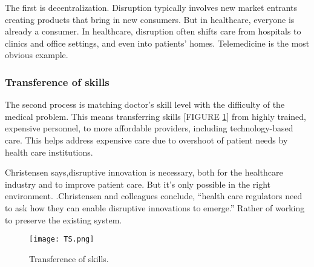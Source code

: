 \documentclass[12pt]{article}
\begin{document}
The first is decentralization. Disruption typically involves new market entrants creating products that bring in new consumers. But in healthcare, everyone is already a consumer. In healthcare, disruption often shifts care from hospitals to clinics and office settings, and even into patients’ homes. Telemedicine is the most obvious example.

\subsubsection{Transference of skills} 

The second process is matching doctor's skill level with the difficulty of the medical problem. This means transferring skills [FIGURE \ref{fig_TS}]  from highly trained, expensive personnel, to more affordable providers, including technology-based care. This helps address expensive care due to overshoot of patient needs by health care institutions.

Christensen says,disruptive innovation is necessary,  both for the healthcare industry and to improve patient care. But it’s only possible in the right environment. .Christensen and colleagues conclude, “health care regulators need to ask how they can enable disruptive innovations to emerge.” Rather of working to preserve the existing system.
\begin{figure}[h]
\centering
\texttt{[image: TS.png]}
\caption{Transference of skills.}
\label{fig_TS}
\end{figure}
\clearpage
\end{document}

